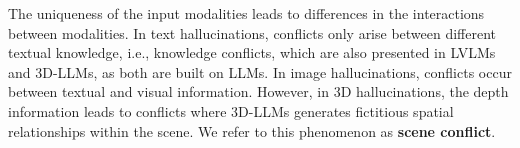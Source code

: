 \begin{table}[h]
\centering
\Large
{}
\caption{Modality Difference}
\label{table:Different_modality}
\end{table}

\begin{table}[h]
\centering
\Large
{}
\caption{Classification of Hallucinations}
\label{table:classification}
\end{table}

The uniqueness of the input modalities leads to differences in the interactions between modalities. In text hallucinations, conflicts only arise between different textual knowledge, i.e., knowledge conflicts, which are also presented in LVLMs and 3D-LLMs, as both are built on LLMs. In image hallucinations, conflicts occur between textual and visual information. However, in 3D hallucinations, the depth information leads to conflicts where 3D-LLMs generates fictitious spatial relationships within the scene. We refer to this phenomenon as \textbf{scene conflict}.

